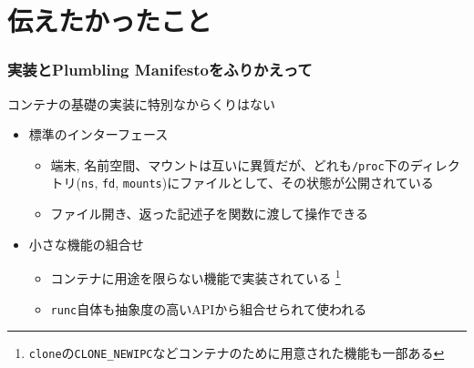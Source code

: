 \documentclass[unicode, 14pt, aspectratio=169]{beamer}
\begin{document}
\section{伝えたかったこと}
\begin{frame}[t]
  \frametitle{実装とPlumbling Manifestoをふりかえって}
  \large
  コンテナの基礎の実装に特別なからくりはない
  \normalsize
  \begin{itemize}[leftmargin=0.8cm,label=$\circ$]
  \item 標準のインターフェース
    \begin{itemize}[leftmargin=0.8cm,label=$\circ$]
    \item 端末, 名前空間、マウントは互いに異質だが、どれも\texttt{/proc}下のディレクトリ(\texttt{ns}, \texttt{fd}, \texttt{mounts})にファイルとして、その状態が公開されている
    \item ファイル開き、返った記述子を関数に渡して操作できる
    \end{itemize}
  \item 小さな機能の組合せ
    \begin{itemize}[leftmargin=0.8cm,label=$\circ$]
      \item コンテナに用途を限らない機能で実装されている
        \footnote{\texttt{clone}の\texttt{CLONE\_NEWIPC}などコンテナのために用意された機能も一部ある\supercite{clone}}
      \item \texttt{runc}自体も抽象度の高いAPIから組合せられて使われる
    \end{itemize}
  \end{itemize}  
\end{frame}
\end{document}
